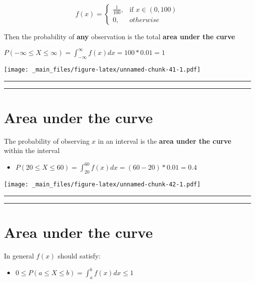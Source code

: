 \documentclass[
]{book}
\providecommand{\tightlist}{%
  \setlength{\itemsep}{0pt}\setlength{\parskip}{0pt}}
\begin{document}
\[
    f(x)= 
\begin{cases}
    \frac{1}{100},& \text{if } x\in (0,100)\\
    0,& otherwise 
\end{cases}
\]

Then the probability of \textbf{any} observation is the total \textbf{area under the curve}

\(P(-\infty\leq X \leq \infty)= \int_{-\infty}^{\infty} f(x) dx = 100*0.01= 1\)

\texttt{[image: \_main\_files/figure-latex/unnamed-chunk-41-1.pdf]}

\begin{center}\rule{0.5\linewidth}{0.5pt}\end{center}

\begin{center}\rule{0.5\linewidth}{0.5pt}\end{center}

\hypertarget{area-under-the-curve}{%
\section{Area under the curve}\label{area-under-the-curve}}

The probability of observing \(x\) in an interval is the \textbf{area under the curve} within the interval

\begin{itemize}
\tightlist
\item
  \(P(20 \leq X \leq 60) = \int_{20}^{60} f(x) dx = (60-20)*0.01=0.4\)
\end{itemize}

\texttt{[image: \_main\_files/figure-latex/unnamed-chunk-42-1.pdf]}

\begin{center}\rule{0.5\linewidth}{0.5pt}\end{center}

\begin{center}\rule{0.5\linewidth}{0.5pt}\end{center}

\hypertarget{area-under-the-curve-1}{%
\section{Area under the curve}\label{area-under-the-curve-1}}

In general \(f(x)\) should satisfy:

\begin{itemize}
\tightlist
\item
  \(0 \leq P(a \leq X \leq b) = \int_{a}^{b} f(x) dx \leq 1\)
\end{itemize}
\end{document}
